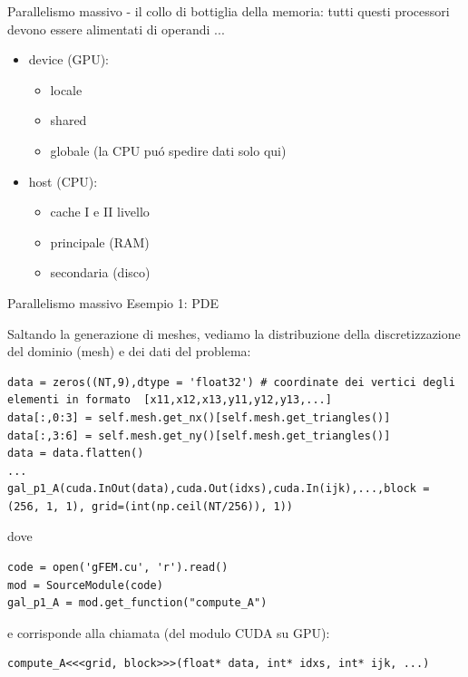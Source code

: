 \documentclass{beamer}
\begin{document}
\begin{frame}{Parallelismo massivo}
- il collo di bottiglia della memoria: tutti questi processori devono essere alimentati di operandi ...
\begin{itemize}
\item device (GPU):
	\begin{itemize}
	\item locale
	\item shared
	\item globale (la CPU pu\'o spedire dati solo qui)
	\end{itemize}
\item host (CPU):
	\begin{itemize}
	\item cache I e II livello
	\item principale (RAM)
	\item secondaria (disco)
	\end{itemize}
\end{itemize}

\end{frame}


\begin{frame}[fragile]{Parallelismo massivo}
Esempio 1: PDE

Saltando la generazione di meshes, vediamo la distribuzione della discretizzazione del dominio (mesh) e dei dati del problema:
\begin{lstlisting}
data = zeros((NT,9),dtype = 'float32') # coordinate dei vertici degli elementi in formato  [x11,x12,x13,y11,y12,y13,...]
data[:,0:3] = self.mesh.get_nx()[self.mesh.get_triangles()]
data[:,3:6] = self.mesh.get_ny()[self.mesh.get_triangles()]
data = data.flatten()
...
gal_p1_A(cuda.InOut(data),cuda.Out(idxs),cuda.In(ijk),...,block = (256, 1, 1), grid=(int(np.ceil(NT/256)), 1))
\end{lstlisting}
dove 
\begin{lstlisting}
code = open('gFEM.cu', 'r').read()
mod = SourceModule(code)
gal_p1_A = mod.get_function("compute_A")
\end{lstlisting}
e corrisponde alla chiamata (del modulo CUDA su GPU):
\begin{lstlisting}
compute_A<<<grid, block>>>(float* data, int* idxs, int* ijk, ...)
\end{lstlisting}

\end{frame}
\end{document}
